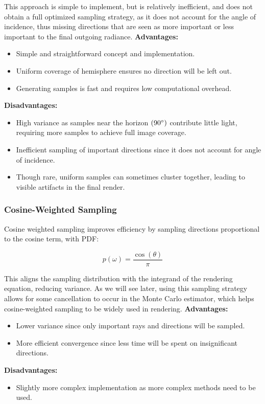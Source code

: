 \documentclass[12pt]{article}
\begin{document}
This approach is simple to implement, but is relatively inefficient, and does not obtain a full optimized sampling strategy, as it does not account for the angle of incidence, thus missing directions that are seen as more important or less important to the final outgoing radiance. \newline
\textbf{Advantages:}
\begin{itemize}
\item Simple and straightforward concept and implementation.
\item Uniform coverage of hemisphere ensures no direction will be left out.
\item Generating samples is fast and requires low computational overhead.

\end{itemize}
\textbf{Disadvantages:}
\begin{itemize}
\item High variance as samples near the horizon $(90 \degree)$ contribute little light, requiring more samples to achieve full image coverage.
\item Inefficient sampling of important directions since it does not account for angle of incidence.
\item Though rare, uniform samples can sometimes cluster together, leading to visible artifacts in the final render.
\end{itemize}

\subsubsection{Cosine-Weighted Sampling}
Cosine weighted sampling improves efficiency by sampling directions proportional to the cosine term, with PDF:

\[
p(\omega) = \frac{\cos(\theta)}{\pi}
\]

This aligns the sampling distribution with the integrand of the rendering equation, reducing variance. As we will see later, using this sampling strategy allows for some cancellation to occur in the Monte Carlo estimator, which helps cosine-weighted sampling to be widely used in rendering.
\newline
\textbf{Advantages:}
\begin{itemize}
\item Lower variance since only important rays and directions will be sampled.
\item More efficient convergence since less time will be spent on insignificant directions.
\end{itemize}
\textbf{Disadvantages:}
\begin{itemize}
\item Slightly more complex implementation as more complex methods need to be used.
\end{itemize}
\end{document}
